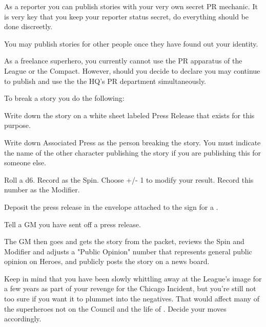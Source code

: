 \documentclass[green]{LRSguildcamp1}
\begin{document}
\name{\gNewspaperPR{}}

As a reporter you can publish stories with your very own secret PR mechanic. It is very key that you keep your reporter status secret, do everything should be done discreetly. 

You may publish stories for other people once they have found out your identity. 

As a freelance superhero, you currently cannot use the PR apparatus of the League or the Compact. However, should you decide to declare you may continue to publish and use the the HQ's PR department simultaneously.  

To break a story you do the following:

\item Write down the story on a white sheet labeled Press Release that exists for this purpose. 

\item Write down Associated Press as the person breaking the story. You must indicate the name of the other character publishing the story if you are publishing this for someone else. 

\item Roll a d6. Record as the Spin. Choose +/- 1 to modify your result. Record this number as the Modifier. 

\item Deposit the press release in the envelope attached to the sign for a \sWallPhone{}. 

\item Tell a GM you have sent off a press release.

\item The GM then goes and gets the story from the packet, reviews the Spin and Modifier and adjusts a "Public Opinion" number that represents general public opinion on Heroes, and publicly posts the story on a news board. 

Keep in mind that you have been slowly whittling away at the League's image for a few years as part of your revenge for the Chicago Incident, but you're still not too sure if you want it to plummet into the negatives. That would affect many of the superheroes not on the Council and the life of \cYoungest{}.  Decide your moves accordingly.
\end{document}
